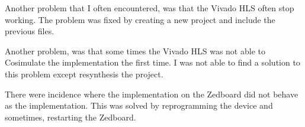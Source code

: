 Another problem that I often encountered, was that the Vivado HLS often stop working. The problem was fixed by creating a new project and include the previous files.

Another problem, was that some times the Vivado HLS was not able to Cosimulate the implementation the first time. I was not able to find a solution to this problem except resynthesis the project. 

There were incidence where the implementation on the Zedboard did not behave as the implementation. This was solved by reprogramming the device and sometimes, restarting the Zedboard.

